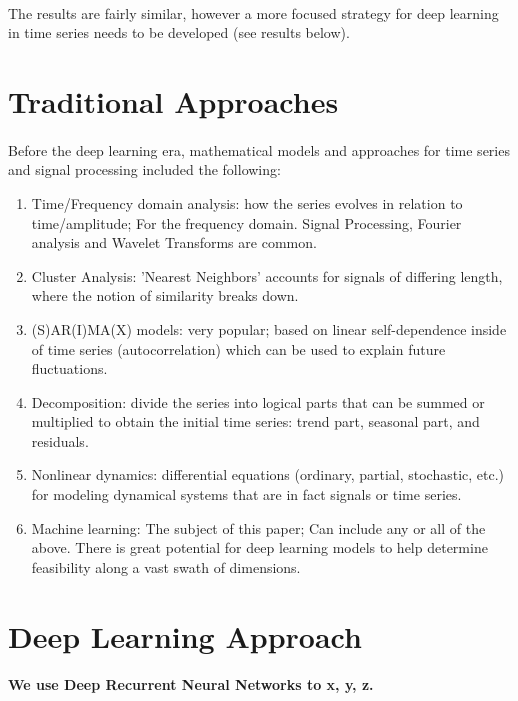 \documentclass{article}
\begin{document}
\paragraph{}
The results are fairly similar, however a more focused strategy for deep learning in time series needs to be developed (see results below).
\section{Traditional Approaches}
\paragraph{}
Before the deep learning era, mathematical models and approaches for time series and signal processing included the following:

\begin{enumerate}
    \item Time/Frequency domain analysis: how the series evolves in relation to time/amplitude; For the frequency domain. Signal Processing, Fourier analysis and Wavelet Transforms are common.
    \item Cluster Analysis: 'Nearest Neighbors' accounts for signals of differing length, where the notion of similarity breaks down.
    \item (S)AR(I)MA(X) models: very popular; based on linear self-dependence inside of time series (autocorrelation) which can be used to explain future fluctuations.
    \item Decomposition: divide the series into logical parts that can be summed or multiplied to obtain the initial time series: trend part, seasonal part, and residuals.
    \item Nonlinear dynamics: differential equations (ordinary, partial, stochastic, etc.) for modeling dynamical systems that are in fact signals or time series.
    \item Machine learning: The subject of this paper; Can include any or all of the above. There is great potential for deep learning models to help determine feasibility along a vast swath of dimensions.
\end{enumerate}

\section{Deep Learning Approach}
\paragraph{We use Deep Recurrent Neural Networks to x, y, z.}
\end{document}
